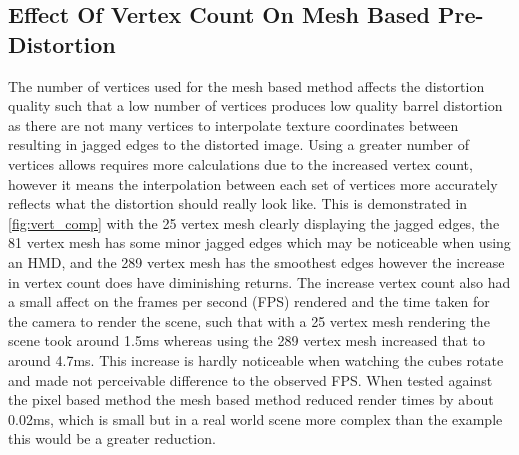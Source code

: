 \documentclass[]{article}
\begin{document}
\subsection{Effect Of Vertex Count On Mesh Based Pre-Distortion}
The number of vertices used for the mesh based method affects the distortion quality such that a low number of vertices produces low quality barrel distortion as there are not many vertices to interpolate texture coordinates between resulting in jagged edges to the distorted image. Using a greater number of vertices allows requires more calculations due to the increased vertex count, however it means the interpolation between each set of vertices more accurately reflects what the distortion should really look like. This is demonstrated in \autoref{fig:vert_comp} with the 25 vertex mesh clearly displaying the jagged edges, the 81 vertex mesh has some minor jagged edges which may be noticeable when using an HMD, and the 289 vertex mesh has the smoothest edges however the increase in vertex count does have diminishing returns. The increase vertex count also had a small affect on the frames per second (FPS) rendered and the time taken for the camera to render the scene, such that with a 25 vertex mesh rendering the scene took around 1.5ms whereas using the 289 vertex mesh increased that to around 4.7ms. This increase is hardly noticeable when watching the cubes rotate and made not perceivable difference to the observed FPS. When tested against the pixel based method the mesh based method reduced render times by about 0.02ms, which is small but in a real world scene more complex than the example this would be a greater reduction.
\end{document}
